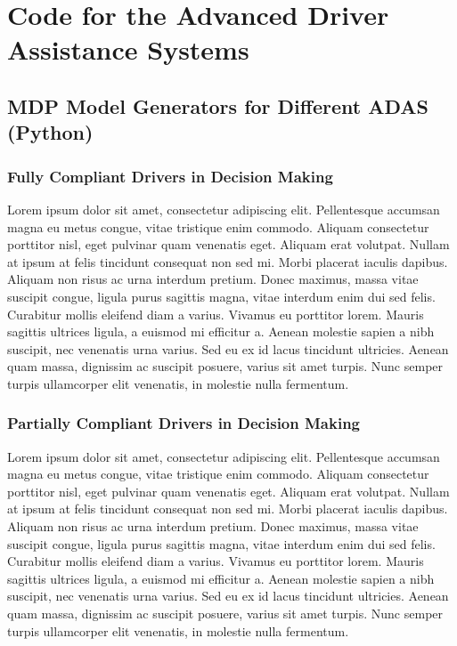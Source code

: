 \chapter{Code for the Advanced Driver Assistance Systems}

\section{MDP Model Generators for Different ADAS (Python)}

\subsection{Fully Compliant Drivers in Decision Making}
\label{sec:adas_pdm}

Lorem ipsum dolor sit amet, consectetur adipiscing elit. Pellentesque accumsan magna eu metus congue, vitae tristique enim commodo. Aliquam consectetur porttitor nisl, eget pulvinar quam venenatis eget. Aliquam erat volutpat. Nullam at ipsum at felis tincidunt consequat non sed mi. Morbi placerat iaculis dapibus. Aliquam non risus ac urna interdum pretium. Donec maximus, massa vitae suscipit congue, ligula purus sagittis magna, vitae interdum enim dui sed felis. Curabitur mollis eleifend diam a varius. Vivamus eu porttitor lorem. Mauris sagittis ultrices ligula, a euismod mi efficitur a. Aenean molestie sapien a nibh suscipit, nec venenatis urna varius. Sed eu ex id lacus tincidunt ultricies. Aenean quam massa, dignissim ac suscipit posuere, varius sit amet turpis. Nunc semper turpis ullamcorper elit venenatis, in molestie nulla fermentum.

\subsection{Partially Compliant Drivers in Decision Making}
\label{sec:adas_idm}

Lorem ipsum dolor sit amet, consectetur adipiscing elit. Pellentesque accumsan magna eu metus congue, vitae tristique enim commodo. Aliquam consectetur porttitor nisl, eget pulvinar quam venenatis eget. Aliquam erat volutpat. Nullam at ipsum at felis tincidunt consequat non sed mi. Morbi placerat iaculis dapibus. Aliquam non risus ac urna interdum pretium. Donec maximus, massa vitae suscipit congue, ligula purus sagittis magna, vitae interdum enim dui sed felis. Curabitur mollis eleifend diam a varius. Vivamus eu porttitor lorem. Mauris sagittis ultrices ligula, a euismod mi efficitur a. Aenean molestie sapien a nibh suscipit, nec venenatis urna varius. Sed eu ex id lacus tincidunt ultricies. Aenean quam massa, dignissim ac suscipit posuere, varius sit amet turpis. Nunc semper turpis ullamcorper elit venenatis, in molestie nulla fermentum.

